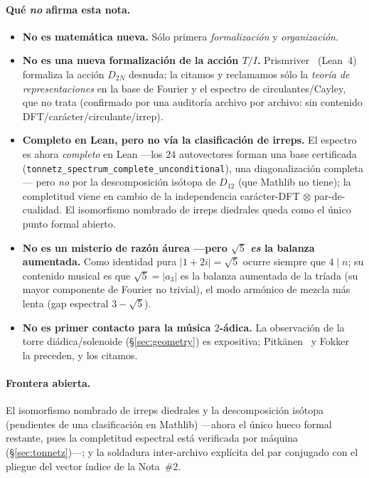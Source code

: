 \documentclass[11pt]{article}
\newcommand{\lean}[1]{\texttt{#1}}
\begin{document}
\paragraph{Qu\'e \emph{no} afirma esta nota.}
\begin{itemize}\itemsep2pt
  \item \textbf{No es matem\'atica nueva.} S\'olo primera \emph{formalizaci\'on} y \emph{organizaci\'on}.
  \item \textbf{No es una nueva formalizaci\'on de la acci\'on $T/I$.} Prismriver~\cite{Prismriver} (Lean~4)
        formaliza la acci\'on $D_{2N}$ desnuda; la citamos y reclamamos s\'olo la \emph{teor\'ia de
        representaciones} en la base de Fourier y el espectro de circulantes/Cayley, que no trata (confirmado
        por una auditor\'ia archivo por archivo: sin contenido DFT/car\'acter/circulante/irrep).
  \item \textbf{Completo en Lean, pero no v\'ia la clasificaci\'on de irreps.} El espectro es ahora
        \emph{completo} en Lean ---los $24$ autovectores forman una base certificada
        (\lean{tonnetz\_spectrum\_\allowbreak complete\_\allowbreak unconditional}), una diagonalizaci\'on
        completa--- pero \emph{no}
        por la descomposici\'on is\'otopa de $D_{12}$ (que Mathlib no tiene); la completitud viene en cambio
        de la independencia car\'acter-DFT $\otimes$ par-de-cualidad. El isomorfismo nombrado de irreps
        diedrales queda como el \'unico punto formal abierto.
  \item \textbf{No es un misterio de raz\'on \'aurea ---pero $\sqrt5$ \emph{es} la balanza aumentada.} Como
        identidad pura $|1+2i|=\sqrt5$ ocurre siempre que $4\mid n$; su contenido musical es que
        $\sqrt5=|a_3|$ es la balanza aumentada de la tr\'iada (su mayor componente de Fourier no trivial), el
        modo arm\'onico de mezcla m\'as lenta (gap espectral $3-\sqrt5$).
  \item \textbf{No es primer contacto para la m\'usica $2$-\'adica.} La observaci\'on de la torre
        di\'adica/solenoide (\S\ref{sec:geometry}) es expositiva; Pitk\"anen~\cite{Pitkanen} y
        Fokker~\cite{Fokker} la preceden, y los citamos.
\end{itemize}

\paragraph{Frontera abierta.} El isomorfismo nombrado de irreps diedrales y la descomposici\'on is\'otopa
(pendientes de una clasificaci\'on en Mathlib) ---ahora el \'unico hueco formal restante, pues la completitud
espectral est\'a verificada por m\'aquina (\S\ref{sec:tonnetz})---; y la soldadura inter-archivo expl\'icita
del par conjugado con el pliegue del vector \'indice de la Nota~\#2.
\end{document}
